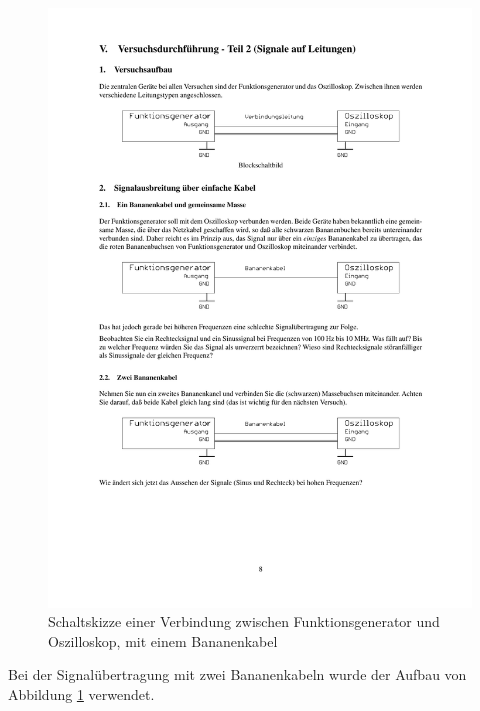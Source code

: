 \documentclass[12pt,a4paper]{article}
\begin{document}
\begin{figure}[H] 
  \centering
    \includegraphics[trim = 10mm 142mm 10mm 125mm, clip, scale = 1]{2_0-2_2.pdf}
  	\caption[Schaltskizze einer Verbindung zwischen Funktionsgenerator und Oszilloskop, mit einem Bananenkabel]{Schaltskizze einer Verbindung zwischen Funktionsgenerator und Oszilloskop, mit einem Bananenkabel\footnotemark}
  \label{fig:2.1}
\end{figure}

Bei der Signalübertragung mit zwei Bananenkabeln wurde der Aufbau von Abbildung \ref{fig:2.1} verwendet.
\end{document}
